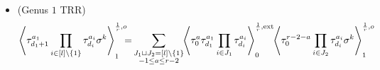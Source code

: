 \documentclass[11pt]{amsart}
\theoremstyle{definition}
\theoremstyle{remark}
\newcommand{\<}{\left<}
\renewcommand{\>}{\right>}
\numberwithin{equation}{section}
\begin{document}
\begin{itemize}
Then
\begin{align*}
\<\tau_{d_1+1}^{a_1}\prod_{i=2}^l\tau^{a_i}_{d_i}\sigma^k\>^{\frac{1}{r},o}_0=&
\sum_{a=-1}^{r-2}\sum_{S \sqcup R = \{3,\ldots,l\}}\left\langle \tau_0^{a}\tau_{d_1}^{a_1}\prod_{i \in S}\tau_{d_i}^{a_i}\right\rangle^{\frac{1}{r},{ext}}_0
\left\langle \tau_0^{r-2-a}\tau^{a_2}_{d_2}\prod_{i\in R}\tau^{a_i}_{d_i}\sigma^k\right\rangle^{\frac{1}{r},o}_0+\\
&+\sum_{\substack{S \sqcup R = \{3,\ldots,l\} \\ k_1 + k_2 = k}} \binom{k}{k_1} \left\langle \tau^{a_1}_{d_1} \prod_{i \in S} \tau^{a_i}_{d_i}\sigma^{k_1}\right\rangle^{\frac{1}{r},o}_0 \left\langle \tau^{a_2}_{d_2}\prod_{i \in R} \tau^{a_i}_{d_i} \sigma^{k_2+1}\right\rangle^{\frac{1}{r}, o}_0.
\end{align*}
\item[(c)](Genus $1$ TRR)
\begin{equation}
\begin{split}
\left\langle \tau_{d_{1}+1}^{a_1}\prod_{i\in [l]\setminus \{1\}}\tau^{a_i}_{d_i}\sigma^k\right\rangle^{\frac{1}{r},o}_1\hspace{-0.2cm}
=&\sum_{\substack{J_1 \sqcup J_2 = [l]\setminus\{1\}\\ -1\le a \le r-2}}\hspace{-0.1cm}\left\langle \tau_0^{a}\tau_{d_{1}}^{a_{1}}\prod_{i \in J_1}\tau_{d_i}^{a_i}\right\rangle^{\frac{1}{r},\text{ext}}_0
\hspace{-0.1cm}\left\langle \tau_0^{r-2-a}\prod_{i\in J_2}\tau^{a_i}_{d_i}\sigma^k\right\rangle^{\frac{1}{r},o}_1\\

\end{split}
\end{equation}
\end{itemize}
\end{document}
